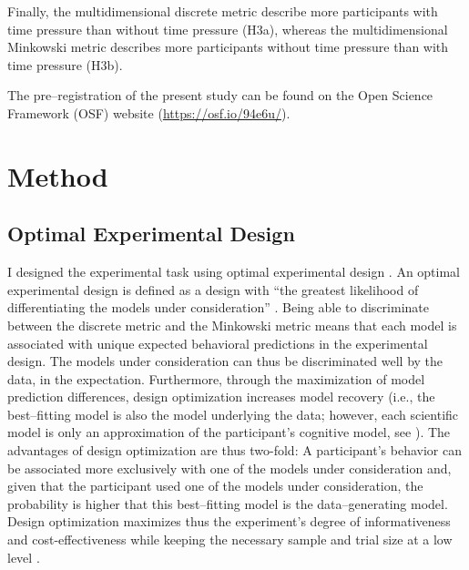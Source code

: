 \documentclass[a4paper,man,natbib]{apa6}
\begin{document}
Finally, the multidimensional discrete metric describe more participants with time pressure than without time pressure (H3a), whereas the multidimensional Minkowski metric describes more participants without time pressure than with time pressure (H3b).

The pre--registration of the present study can be found on the Open Science Framework (OSF) website (\href{https://osf.io/94e6u/}{https://osf.io/94e6u/}).

\section{Method}

\subsection{Optimal Experimental Design}
I designed the experimental task using optimal experimental design \citep{myung2009optimal}. An optimal experimental design is defined as a design with ``the greatest likelihood of differentiating the models under consideration'' \cite[][p. 500]{myung2009optimal}. Being able to discriminate between the discrete metric and the Minkowski metric means that each model is associated with unique expected behavioral predictions in the experimental design. The models under consideration can thus be discriminated well by the data, in the expectation. Furthermore, through the maximization of model prediction differences, design optimization increases model recovery (i.e., the best--fitting model is also the model underlying the data; however, each scientific model is only an approximation of the participant's cognitive model, see \citealp{myung2009optimal}). The advantages of design optimization are thus two-fold: A participant's behavior can be associated more exclusively with one of the models under consideration and, given that the participant used one of the models under consideration, the probability is higher that this best--fitting model is the data--generating model. Design optimization maximizes thus the experiment's degree of informativeness and cost-effectiveness while keeping the necessary sample and trial size at a low level \citep{cavagnaro2009better, ouyang2016practical, raffert2012optimally, atkinson2007optimum, nelson2005finding}. 
\end{document}
